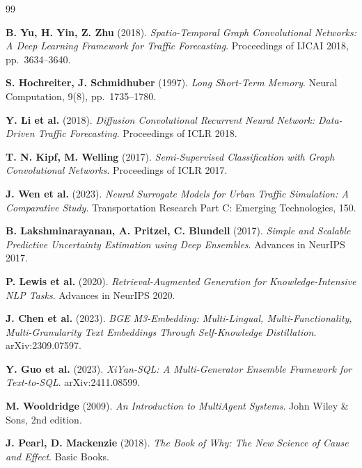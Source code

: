 \documentclass[12pt,a4paper]{report}
\begin{document}
\begin{thebibliography}{99}

\textbf{B. Yu, H. Yin, Z. Zhu} (2018).
\textit{Spatio-Temporal Graph Convolutional Networks: A Deep Learning Framework for Traffic Forecasting}.
Proceedings of IJCAI 2018, pp.~3634--3640.

\textbf{S. Hochreiter, J. Schmidhuber} (1997).
\textit{Long Short-Term Memory}.
Neural Computation, 9(8), pp.~1735--1780.

\textbf{Y. Li et al.} (2018).
\textit{Diffusion Convolutional Recurrent Neural Network: Data-Driven Traffic Forecasting}.
Proceedings of ICLR 2018.

\textbf{T. N. Kipf, M. Welling} (2017).
\textit{Semi-Supervised Classification with Graph Convolutional Networks}.
Proceedings of ICLR 2017.

\textbf{J. Wen et al.} (2023).
\textit{Neural Surrogate Models for Urban Traffic Simulation: A Comparative Study}.
Transportation Research Part C: Emerging Technologies, 150.

\textbf{B. Lakshminarayanan, A. Pritzel, C. Blundell} (2017).
\textit{Simple and Scalable Predictive Uncertainty Estimation using Deep Ensembles}.
Advances in NeurIPS 2017.

\textbf{P. Lewis et al.} (2020).
\textit{Retrieval-Augmented Generation for Knowledge-Intensive NLP Tasks}.
Advances in NeurIPS 2020.

\textbf{J. Chen et al.} (2023).
\textit{BGE M3-Embedding: Multi-Lingual, Multi-Functionality, Multi-Granularity Text Embeddings Through Self-Knowledge Distillation}.
arXiv:2309.07597.

\textbf{Y. Guo et al.} (2023).
\textit{XiYan-SQL: A Multi-Generator Ensemble Framework for Text-to-SQL}.
arXiv:2411.08599.

\textbf{M. Wooldridge} (2009).
\textit{An Introduction to MultiAgent Systems}.
John Wiley \& Sons, 2nd edition.

\textbf{J. Pearl, D. Mackenzie} (2018).
\textit{The Book of Why: The New Science of Cause and Effect}.
Basic Books.


\end{thebibliography}
\end{document}
